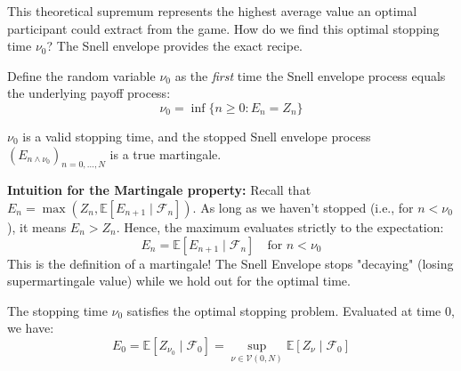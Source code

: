 This theoretical supremum represents the highest average value an optimal participant could extract from the game. How do we find this optimal stopping time $\nu_0$? The Snell envelope provides the exact recipe.

\begin{definition}
Define the random variable $\nu_0$ as the \textit{first} time the Snell envelope process equals the underlying payoff process:
$$ \nu_0 = \inf \{ n \geq 0 : E_n = Z_n \} $$
\end{definition}

\begin{lemma}
$\nu_0$ is a valid stopping time, and the stopped Snell envelope process $(E_{n \wedge \nu_0})_{n=0, \dots, N}$ is a true martingale.
\end{lemma}

\textbf{Intuition for the Martingale property:} Recall that $E_n = \max(Z_n, \mathbb{E}[E_{n+1}\mid \mathcal{F}_n])$. As long as we haven't stopped (i.e., for $n < \nu_0$), it means $E_n > Z_n$. Hence, the maximum evaluates strictly to the expectation:
$$ E_n = \mathbb{E}[E_{n+1} \mid \mathcal{F}_n] \quad \text{for } n < \nu_0 $$
This is the definition of a martingale! The Snell Envelope stops "decaying" (losing supermartingale value) while we hold out for the optimal time. 

\begin{theorem}
The stopping time $\nu_0$ satisfies the optimal stopping problem. Evaluated at time 0, we have:
$$ E_0 = \mathbb{E}\left[ Z_{\nu_0} \mid \mathcal{F}_0 \right] = \sup_{\nu \in \mathcal{V}(0,N)} \mathbb{E}\left[ Z_\nu \mid \mathcal{F}_0 \right] $$
\end{theorem}

